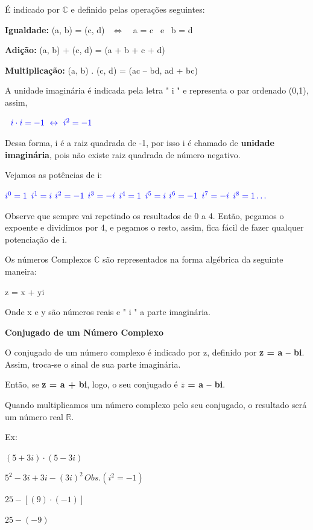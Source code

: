 \begin{multicols*}{2}
	É indicado por $\mathbb{C}$ e definido pelas operações seguintes:
	
	\textbf{Igualdade:} (a, b) = (c, d) $ \ \ \Longleftrightarrow \ $ \ a = c \ e \ b = d 
	
	\textbf{Adição:} (a, b) + (c, d) = (a + b + c + d) 
	
	\textbf{Multiplicação:} (a, b) . (c, d) = (ac – bd, ad + bc)
	
	A unidade imaginária é indicada pela letra " i " e representa o par ordenado (0,1), assim, 
	
	$\color{blue} \ \ i \cdot i = -1 \ \leftrightarrow \ i^2 = -1$
	
	Dessa forma, i é a raiz quadrada de -1, por isso i é chamado de \textbf{unidade imaginária}, pois não existe raiz quadrada de número negativo.
	
	Vejamos as potências de i:
	
	$\color{blue} i^0 = 1$
	$\color{blue} i^1 = i $
	$\color{blue} i^2 = -1$
	$\color{blue} i^3 = -i $
	$\color{blue} i^4 = 1$
	$\color{blue} i^5 = i$
	$\color{blue} i^6 = -1$
	$\color{blue} i^7 = -i$
	$\color{blue} i^8 = 1 \dots$
	
	Observe que sempre vai repetindo os resultados de 0 a 4. Então, pegamos o expoente e dividimos por 4, e pegamos o resto, assim, fica fácil de fazer qualquer potenciação de i.
					
	Os números Complexos $\mathbb{C}$ são representados na forma algébrica da seguinte maneira:
	
	z = x + yi 
	
	Onde x e y são números reais e " i " a parte imaginária.
	
	\textbf{Conjugado de um Número Complexo}
	
	O conjugado de um número complexo é indicado por z, definido por \textbf{\color{blue}z = a – bi}. Assim, troca-se o sinal de sua parte imaginária.

	Então, se \textbf{\color{blue}z = a + bi}, logo, o seu conjugado é \textbf{\color{blue}$\overline{z}$ = a – bi}.

	Quando multiplicamos um número complexo pelo seu conjugado, o resultado será um número real $\mathbb{R}$.
	
	Ex:
	
	   $ (5 + 3i) \cdot (5 - 3i) $
	
	$ 5^2 - 3i + 3i - (3i)^2 \, Obs. (i^2 = -1)$
			
	$ 25 - [(9) \cdot (-1)] $
			
	$ 25 - (-9)$
	

\end{multicols*}
